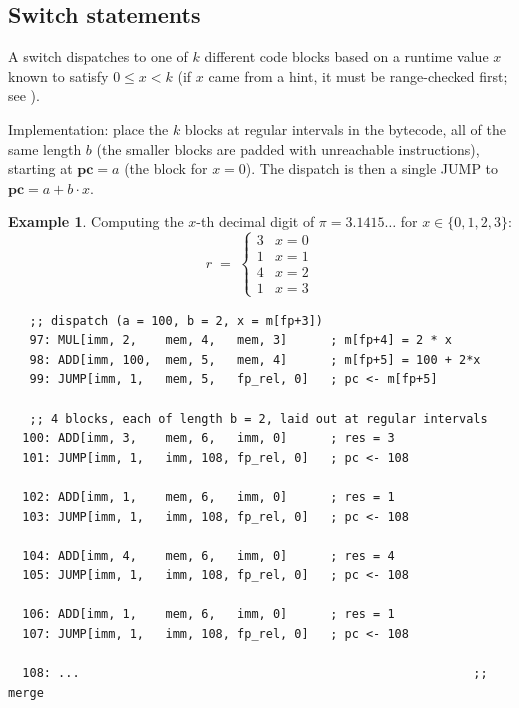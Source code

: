 \documentclass{article}
\theoremstyle{definition}
\newtheorem{exmp}{Example}[section]
\begin{document}
\subsection{Switch statements}

A switch dispatches to one of $k$ different code blocks based on a runtime value $x$ known to satisfy $0 \leq x < k$ (if $x$ came from a hint, it must be range-checked first; see ).

Implementation: place the $k$ blocks at regular intervals in the bytecode, all of the same length $b$ (the smaller blocks are padded with unreachable instructions), starting at $\textbf{pc} = a$ (the block for $x = 0$). The dispatch is then a single JUMP to $\textbf{pc} = a + b \cdot x$.

\begin{exmp}
Computing the $x$-th decimal digit of $\pi = 3.1415\dots$ for $x \in \{0, 1, 2, 3\}$:
\[
    r \;=\; \begin{cases} 3 & x = 0 \\ 1 & x = 1 \\ 4 & x = 2 \\ 1 & x = 3 \end{cases}
\]

\begin{framed}
\small
\begin{verbatim}
   ;; dispatch (a = 100, b = 2, x = m[fp+3])
   97: MUL[imm, 2,    mem, 4,   mem, 3]      ; m[fp+4] = 2 * x
   98: ADD[imm, 100,  mem, 5,   mem, 4]      ; m[fp+5] = 100 + 2*x
   99: JUMP[imm, 1,   mem, 5,   fp_rel, 0]   ; pc <- m[fp+5]

   ;; 4 blocks, each of length b = 2, laid out at regular intervals
  100: ADD[imm, 3,    mem, 6,   imm, 0]      ; res = 3         
  101: JUMP[imm, 1,   imm, 108, fp_rel, 0]   ; pc <- 108     

  102: ADD[imm, 1,    mem, 6,   imm, 0]      ; res = 1        
  103: JUMP[imm, 1,   imm, 108, fp_rel, 0]   ; pc <- 108   

  104: ADD[imm, 4,    mem, 6,   imm, 0]      ; res = 4        
  105: JUMP[imm, 1,   imm, 108, fp_rel, 0]   ; pc <- 108    

  106: ADD[imm, 1,    mem, 6,   imm, 0]      ; res = 1         
  107: JUMP[imm, 1,   imm, 108, fp_rel, 0]   ; pc <- 108   

  108: ...                                                       ;; merge
\end{verbatim}
\end{framed}

\end{exmp}
\end{document}
